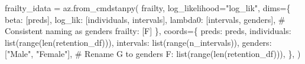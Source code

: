 \documentclass[
  letterpaper,
  DIV=11,
  numbers=noendperiod]{scrartcl}
\newenvironment{Shaded}{\begin{snugshade}}{\end{snugshade}}
\newcommand{\BuiltInTok}[1]{\textcolor[rgb]{0.00,0.23,0.31}{#1}}
\newcommand{\CommentTok}[1]{\textcolor[rgb]{0.37,0.37,0.37}{#1}}
\newcommand{\NormalTok}[1]{\textcolor[rgb]{0.00,0.23,0.31}{#1}}
\newcommand{\OperatorTok}[1]{\textcolor[rgb]{0.37,0.37,0.37}{#1}}
\newcommand{\StringTok}[1]{\textcolor[rgb]{0.13,0.47,0.30}{#1}}
\begin{document}
\begin{Shaded}
\begin{Highlighting}[]
\NormalTok{frailty\_idata }\OperatorTok{=}\NormalTok{ az.from\_cmdstanpy(}
\NormalTok{    frailty,}
\NormalTok{    log\_likelihood}\OperatorTok{=}\StringTok{"log\_lik"}\NormalTok{,}
\NormalTok{    dims}\OperatorTok{=}\NormalTok{\{}
        \StringTok{\textquotesingle{}beta\textquotesingle{}}\NormalTok{: [}\StringTok{\textquotesingle{}preds\textquotesingle{}}\NormalTok{], }
        \StringTok{\textquotesingle{}log\_lik\textquotesingle{}}\NormalTok{: [}\StringTok{\textquotesingle{}individuals\textquotesingle{}}\NormalTok{, }\StringTok{\textquotesingle{}intervals\textquotesingle{}}\NormalTok{], }
        \StringTok{\textquotesingle{}lambda0\textquotesingle{}}\NormalTok{: [}\StringTok{\textquotesingle{}intervals\textquotesingle{}}\NormalTok{, }\StringTok{\textquotesingle{}genders\textquotesingle{}}\NormalTok{],  }\CommentTok{\# Consistent naming as \textquotesingle{}genders\textquotesingle{}}
        \StringTok{\textquotesingle{}frailty\textquotesingle{}}\NormalTok{: [}\StringTok{\textquotesingle{}F\textquotesingle{}}\NormalTok{]}
\NormalTok{    \},}
\NormalTok{    coords}\OperatorTok{=}\NormalTok{\{}
        \StringTok{\textquotesingle{}preds\textquotesingle{}}\NormalTok{: preds, }
        \StringTok{\textquotesingle{}individuals\textquotesingle{}}\NormalTok{: }\BuiltInTok{list}\NormalTok{(}\BuiltInTok{range}\NormalTok{(}\BuiltInTok{len}\NormalTok{(retention\_df))),  }
        \StringTok{\textquotesingle{}intervals\textquotesingle{}}\NormalTok{: }\BuiltInTok{list}\NormalTok{(}\BuiltInTok{range}\NormalTok{(n\_intervals)),  }
        \StringTok{\textquotesingle{}genders\textquotesingle{}}\NormalTok{: [}\StringTok{"Male"}\NormalTok{, }\StringTok{"Female"}\NormalTok{],  }\CommentTok{\# Rename \textquotesingle{}G\textquotesingle{} to \textquotesingle{}genders\textquotesingle{}}
        \StringTok{\textquotesingle{}F\textquotesingle{}}\NormalTok{: }\BuiltInTok{list}\NormalTok{(}\BuiltInTok{range}\NormalTok{(}\BuiltInTok{len}\NormalTok{(retention\_df))),}
\NormalTok{    \},}
\NormalTok{)}
\end{Highlighting}
\end{Shaded}
\end{document}
